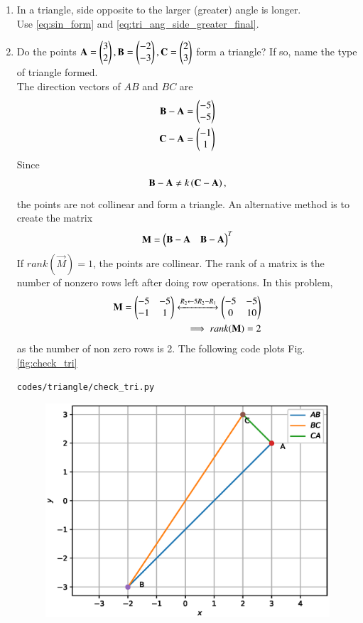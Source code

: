 \begin{enumerate}[label=\arabic*.,ref=\thesubsection.\theenumi]
\item In a triangle, side opposite to the larger (greater) angle is longer. 
%
\\
\solution Use \eqref{eq:sin_form} and \eqref{eq:tri_ang_side_greater_final}.
%
\item Do the points $\mathbf{A}=\begin{pmatrix}3\\2\end{pmatrix}, \mathbf{B}=\begin{pmatrix}-2\\-3\end{pmatrix}, \mathbf{C}=\begin{pmatrix}2\\3\end{pmatrix} $ form a triangle?  If so, name the type of triangle formed.
\label{prob:tri_exam_coll_pts}
%
\\
\solution The direction vectors of $AB$ and $BC$ are 
\begin{align}
\label{eq:tri_geo_ex_baorth}
\mathbf{B}-\mathbf{A} &= \begin{pmatrix}-5\\-5\end{pmatrix}
\\
\mathbf{C}-\mathbf{A} &= \begin{pmatrix}-1\\1\end{pmatrix}
\label{eq:tri_geo_ex_caorth}
\end{align}
%
Since 
%
\begin{align}
\mathbf{B}-\mathbf{A} \ne k\left(\mathbf{C}-\mathbf{A}\right),
\end{align}
%
the points are not collinear and form a triangle.  An alternative method is to create the matrix
\begin{align}
\label{eq:tri_geo_ex_diff_mat}
\mathbf{M} = \begin{pmatrix}\mathbf{B}-\mathbf{A} & \mathbf{B}-\mathbf{A}\end{pmatrix}^T 
\end{align}
%
If $rank(\vec{M}) = 1$, the points are collinear.  The rank of a matrix is the number of nonzero rows left after doing row operations.  In this problem, 
%
\begin{align}
\mathbf{M} = \begin{pmatrix}-5 & -5\\-1 & 1\end{pmatrix}\xleftrightarrow {R_2\leftarrow 5R_2-R_1}\begin{pmatrix}-5 & -5\\0 & 10\end{pmatrix}
\\
\implies rank(\mathbf{M}) = 2
\end{align}
%
as the number of non zero rows is 2.
The following code plots Fig. \ref{fig:check_tri}
%
\begin{lstlisting}
codes/triangle/check_tri.py
\end{lstlisting}
%
\begin{figure}[!ht]
\includegraphics[width=\columnwidth]{./triangle/figs/check_tri.eps}

\end{figure}
\end{enumerate}
